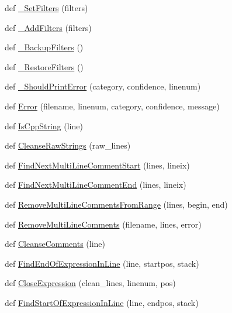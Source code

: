 \begin{DoxyCompactItemize}
\item 
def \hyperlink{namespacecpplint_a314899344c86ce18e2cb26601de8acfd}{\+\_\+\+Set\+Filters} (filters)
\item 
def \hyperlink{namespacecpplint_aea7c4f0262604e3ea337492943a6ed4b}{\+\_\+\+Add\+Filters} (filters)
\item 
def \hyperlink{namespacecpplint_a28c5d8937c4a0e6e15b1960754edb7d3}{\+\_\+\+Backup\+Filters} ()
\item 
def \hyperlink{namespacecpplint_ad07c4846dfa0283a4e2c53bbaae6052d}{\+\_\+\+Restore\+Filters} ()
\item 
def \hyperlink{namespacecpplint_ac1b603bde4e58c40825f841f97ca18e6}{\+\_\+\+Should\+Print\+Error} (category, confidence, linenum)
\item 
def \hyperlink{namespacecpplint_ae51e76d6d73b36b9e965d2ac9d21d7c2}{Error} (filename, linenum, category, confidence, message)
\item 
def \hyperlink{namespacecpplint_a034b93866a853c2e21577fb371a7fa9d}{Is\+Cpp\+String} (line)
\item 
def \hyperlink{namespacecpplint_a61b3f81ef467e7cb417d13e9051180fc}{Cleanse\+Raw\+Strings} (raw\+\_\+lines)
\item 
def \hyperlink{namespacecpplint_af0404401670283c9d4f948180e427401}{Find\+Next\+Multi\+Line\+Comment\+Start} (lines, lineix)
\item 
def \hyperlink{namespacecpplint_a4965d6f615333f43155d9e430471e228}{Find\+Next\+Multi\+Line\+Comment\+End} (lines, lineix)
\item 
def \hyperlink{namespacecpplint_a3a5f71cdc2e78491b4bedde8a0103679}{Remove\+Multi\+Line\+Comments\+From\+Range} (lines, begin, end)
\item 
def \hyperlink{namespacecpplint_ac259a6d0f292aeec05dee7ca312e1fc2}{Remove\+Multi\+Line\+Comments} (filename, lines, error)
\item 
def \hyperlink{namespacecpplint_ad795aa89f263838ec59fb0e7c52c842a}{Cleanse\+Comments} (line)
\item 
def \hyperlink{namespacecpplint_a6e623c46c1ae3bf650454744a693a633}{Find\+End\+Of\+Expression\+In\+Line} (line, startpos, stack)
\item 
def \hyperlink{namespacecpplint_af254258f584f59c87fcfd755e3c9017a}{Close\+Expression} (clean\+\_\+lines, linenum, pos)
\item 
def \hyperlink{namespacecpplint_a8572f47efb3bc11632d1192fd74bb7eb}{Find\+Start\+Of\+Expression\+In\+Line} (line, endpos, stack)
\item 

\end{DoxyCompactItemize}
